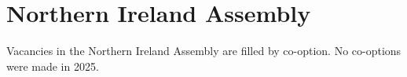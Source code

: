 \documentclass[a4paper,openany]{book}
\begin{document}
%
%

\section{Northern Ireland Assembly}

Vacancies in the Northern Ireland Assembly are filled by co-option.
No co-options were made in 2025.
%
\end{document}
